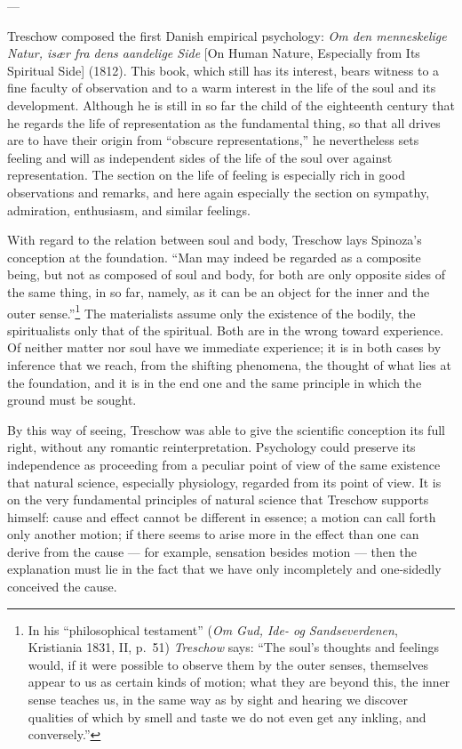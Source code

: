 \documentclass[12pt,a4paper]{book}
\newcommand{\opage}[1]{\marginnote{\footnotesize\textit{[#1]}}}
\begin{document}
\begin{center}---\end{center}

Treschow composed the first Danish empirical psychology: \emph{Om den menneskelige
Natur, især fra dens aandelige Side} [On Human Nature, Especially from Its Spiritual
Side] (1812). This book, which still has its interest, bears witness to a fine faculty
of observation and to a warm interest in the life of the soul and its development.
Although he is still in so far the child of the eighteenth century that he regards the
life of representation as the fundamental thing, so that all drives are to have their
origin from ``obscure representations,'' he nevertheless sets feeling and will as
independent sides of the life of the soul over against representation. The section on
the life of feeling is especially rich in good observations and remarks, and here again
especially the section on sympathy, admiration, enthusiasm, and similar feelings.

With regard to the relation between soul and body, Treschow lays Spinoza's conception at
the foundation. ``Man may indeed be regarded as a composite being, but not as composed
of soul and body, for both are only opposite sides of the same thing, in so far, namely,
as it can be an object for the inner and the outer sense.''\footnote{In his
``philosophical testament'' (\emph{Om Gud, Ide- og Sandseverdenen}, Kristiania 1831, II,
p.~51) \emph{Treschow} says: ``The soul's thoughts and feelings would, if it were possible to
observe them by the outer senses, themselves appear to us as certain kinds of motion;
what they are beyond this, the inner sense teaches us, in the same way as by sight and
hearing we discover qualities of which by smell and taste we do not even get any
inkling, and conversely.''} The materialists assume only the existence of the bodily,
the spiritualists only that of the spiritual. Both are in the wrong toward experience.
Of neither matter nor soul have we immediate experience; it is in both cases by
inference that we reach, from the shifting phenomena, the thought of what lies at the
foundation, and it is in the end one and the same principle in which the ground must be
sought.

By this way of seeing, Treschow was able to give the \opage{91}scientific conception its full
right, without any romantic reinterpretation. Psychology could preserve its independence
as proceeding from a peculiar point of view of the same existence that natural science,
especially physiology, regarded from its point of view. It is on the very fundamental
principles of natural science that Treschow supports himself: cause and effect cannot be
different in essence; a motion can call forth only another motion; if there seems to
arise more in the effect than one can derive from the cause --- for example, sensation
besides motion --- then the explanation must lie in the fact that we have only
incompletely and one-sidedly conceived the cause.
\end{document}

